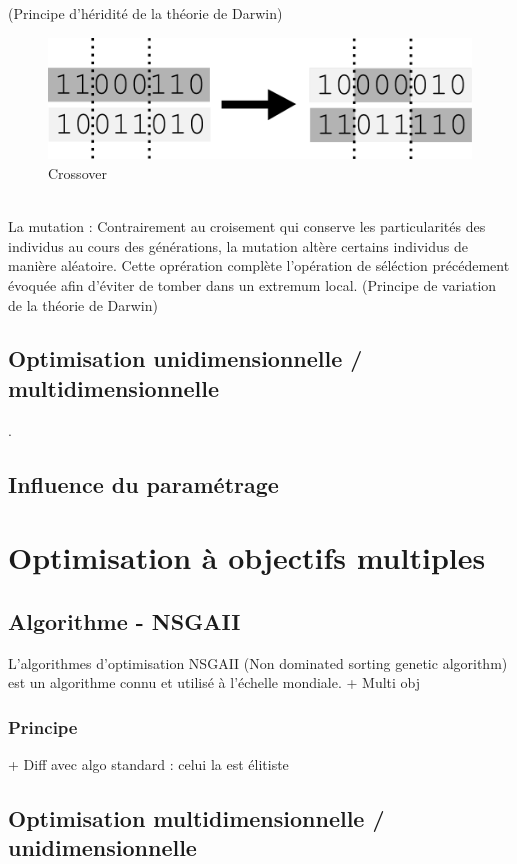 \documentclass[12pt]{report}
\begin{document}
        (Principe d'héridité de la théorie de Darwin)
        \begin{figure}
          \centering
          \includegraphics{img/crossover.png}
          \caption{Crossover}
        \end{figure}
        \\
        La mutation :
        Contrairement au croisement qui conserve les particularités des individus au cours des générations, la mutation altère certains individus de manière aléatoire. Cette oprération complète l'opération de séléction précédement évoquée afin d'éviter de tomber dans un extremum local.
        (Principe de variation de la théorie de Darwin)



    \section{Optimisation unidimensionnelle / multidimensionnelle}.

    \section{Influence du paramétrage }



  \chapter{Optimisation à objectifs multiples}
    \section{Algorithme - NSGAII}
    L'algorithmes d'optimisation NSGAII (Non dominated sorting genetic algorithm) est un algorithme connu et utilisé à l'échelle mondiale.
    + Multi obj
      \subsection{Principe}
      + Diff avec algo standard : celui la est élitiste

    \section{Optimisation multidimensionnelle / unidimensionnelle}
\end{document}
